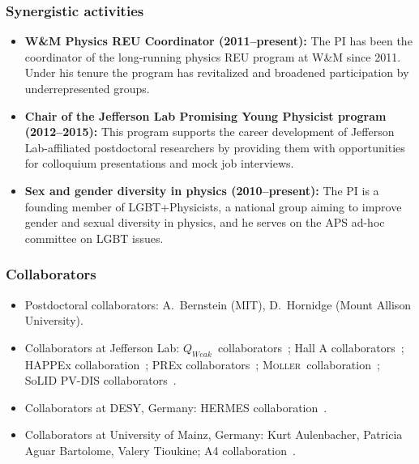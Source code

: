 \documentclass[11pt,letterpaper]{article}
\newcommand{\Qweak}{\texorpdfstring{$Q_{Weak}$}{Qweak}}
\newcommand{\Moller}{\texorpdfstring{\textsc{Moller}}{MOLLER}}
\begin{document}
\subsubsection*{Synergistic activities}
\begin{itemize}
 \setlength{\itemsep}{0pt}
 \setlength{\parskip}{0pt}
 \setlength{\parsep}{0pt}

 \item {\bf W\&M Physics REU Coordinator (2011--present):} The PI has been the coordinator of the long-running physics REU program at W\&M since 2011. Under his tenure the program has revitalized and broadened participation by underrepresented groups.

 \item {\bf Chair of the Jefferson Lab Promising Young Physicist program (2012--2015):} This program supports the career development of Jefferson Lab-affiliated postdoctoral researchers by providing them with opportunities for colloquium presentations and mock job interviews.

 \item {\bf Sex and gender diversity in physics (2010--present):} The PI is a founding member of LGBT+Physicists, a national group aiming to improve gender and sexual diversity in physics, and he serves on the APS ad-hoc committee on LGBT issues.

\end{itemize}


\subsubsection*{Collaborators}
\begin{itemize}
 \setlength{\itemsep}{0pt}
 \setlength{\parskip}{0pt}
 \setlength{\parsep}{0pt}
 \item Postdoctoral collaborators: A.~Bernstein (MIT), D.~Hornidge (Mount Allison University).
 \item Collaborators at Jefferson Lab: \Qweak\ collaborators~\cite{PhysRevLett.111.141803}; Hall A collaborators~\cite{PhysRevLett.111.082501}; HAPPEx collaboration~\cite{PhysRevLett.108.102001}; PREx collaborators~\cite{PhysRevLett.108.112502}; \Moller\ collaboration~\cite{Proposal:Moller}; SoLID PV-DIS collaborators~\cite{Proposal:SoLID-PVDIS}.
 \item Collaborators at DESY, Germany: HERMES collaboration~\cite{PhysRevD.87.074029}.
 \item Collaborators at University of Mainz, Germany: Kurt Aulenbacher, Patricia Aguar Bartolome, Valery Tioukine; A4 collaboration~\cite{PhysRevLett.102.151803}.
\end{itemize}
\end{document}
